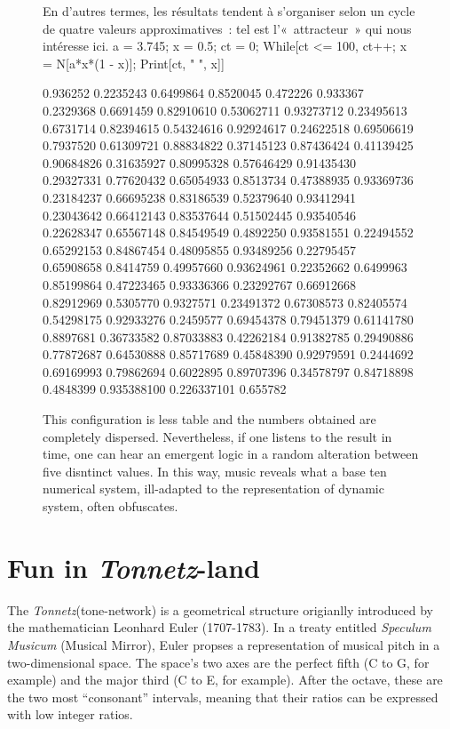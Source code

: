 \documentclass{article}
\newcommand{\Tonnetz}{\emph{Tonnetz}}
\begin{document}
\begin{figure}[h]
En d’autres termes, les résultats tendent à s’organiser selon un cycle de quatre valeurs approximatives : tel est l’« attracteur » qui nous intéresse ici.
a = 3.745; x = 0.5; ct = 0;
While[ct <= 100, ct++; x = N[a*x*(1 - x)];
Print[ct, "  ", x]]

0.936252  0.2235243  0.6499864  0.8520045
0.472226  0.933367  0.2329368  0.6691459
0.82910610  0.53062711  0.93273712  0.23495613
0.6731714  0.82394615  0.54324616  0.92924617
0.24622518  0.69506619  0.7937520  0.61309721
0.88834822  0.37145123  0.87436424  0.41139425
0.90684826  0.31635927  0.80995328  0.57646429
0.91435430  0.29327331  0.77620432  0.65054933
0.8513734  0.47388935  0.93369736  0.23184237
0.66695238  0.83186539  0.52379640  0.93412941
0.23043642  0.66412143  0.83537644  0.51502445
0.93540546  0.22628347  0.65567148  0.84549549
0.4892250  0.93581551  0.22494552  0.65292153
0.84867454  0.48095855  0.93489256  0.22795457
0.65908658  0.8414759  0.49957660  0.93624961
0.22352662  0.6499963  0.85199864  0.47223465
0.93336366  0.23292767  0.66912668  0.82912969
0.5305770  0.9327571  0.23491372  0.67308573
0.82405574  0.54298175  0.92933276  0.2459577
0.69454378  0.79451379  0.61141780  0.8897681
0.36733582  0.87033883  0.42262184  0.91382785
0.29490886  0.77872687  0.64530888  0.85717689
0.45848390  0.92979591  0.2444692  0.69169993
0.79862694  0.6022895  0.89707396  0.34578797
0.84718898  0.4848399  0.935388100  0.226337101
0.655782
\caption{This configuration is less table and the numbers obtained are
completely dispersed.  Nevertheless, if one listens to the result in time,
one can hear an emergent logic in a random alteration between five disntinct
values.  In this way, music reveals what a base ten numerical system,
ill-adapted to the representation of dynamic system, often obfuscates.}
\end{figure}
\section*{Fun in \Tonnetz-land}
The \Tonnetz (tone-network) is a geometrical structure origianlly
introduced by the mathematician Leonhard Euler (1707-1783). In a treaty
entitled \emph{Speculum Musicum} (Musical Mirror), Euler propses a
representation of musical pitch in a two-dimensional space.  The space's two
axes are the perfect fifth (C to G, for example) and the major third (C to
E, for example).  After the octave, these are the two most ``consonant''
intervals, meaning that their ratios can be expressed with low integer
ratios.
\end{document}
